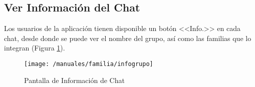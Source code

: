 \subsection*{Ver Información del Chat}
Los usuarios de la aplicación tienen disponible un botón <<Info.>> en cada chat, desde donde se puede ver el nombre del grupo, así como las familias que lo integran (Figura \ref{fig:infochatfamilia}).

\begin{figure}[!h]
	\begin{center}
		\texttt{[image: /manuales/familia/infogrupo]}
		\caption{Pantalla de Información de Chat}
		\label{fig:infochatfamilia}
	\end{center}
\end{figure}